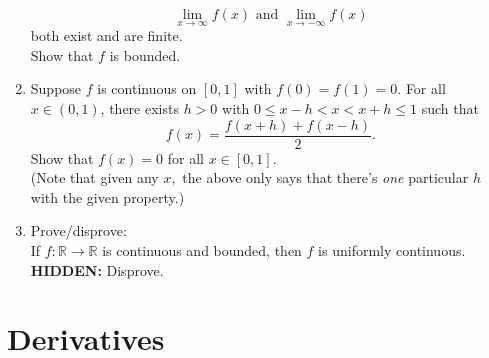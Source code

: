\documentclass[12pt]{article}
\theoremstyle{definition}
\numberwithin{thm}{section}
\newcommand{\hint}[1]{\textbf{HIDDEN:} {\color[rgb]{0.95, 0.95, 0.95}#1}}
\begin{document}
\begin{enumerate}
\begin{equation*}
		\lim_{x\to \infty}f(x) \text{ and } \lim_{x\to -\infty}f(x)
	\end{equation*}
	both exist and are finite.\\
	Show that $f$ is bounded.
	\item Suppose $f$ is continuous on $[0, 1]$ with $f(0) = f(1) = 0.$ For all $x\in (0, 1)$, there exists $h > 0$ with $0 \le x - h < x < x + h \le 1$ such that 
	\begin{equation*} 
		f(x)=\dfrac{f(x + h) + f(x - h)}{2}.
	\end{equation*} 
	Show that $f(x) = 0$ for all $x \in [0, 1].$\\
	(Note that given any $x,$ the above only says that there's \emph{one} particular $h$ with the given property.)
	\item Prove/disprove:\\
	If $f:\mathbb{R} \to \mathbb{R}$ is continuous and bounded, then $f$ is uniformly continuous.\\
	\hint{Disprove.}
\end{enumerate}
\newpage\section{Derivatives}
\end{document}
